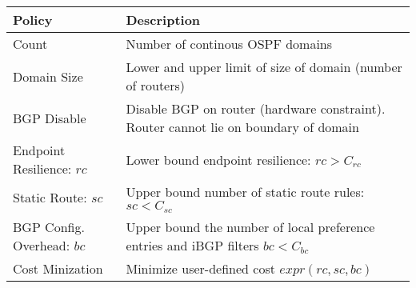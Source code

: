 \begin{table}[t!]
\begin{small}
	\begin{center}
		\begin{tabular}{m{7em} | m{17em} } 
			Policy & Description \\ 
			\hline
			Count & Number of continous OSPF domains  \\ \hline
			Domain Size  & Lower and upper
			limit of size of domain (number of routers) \\ \hline
			BGP \newline Disable & Disable BGP on router (hardware constraint). 
			Router cannot lie on boundary of domain \\ \hline
			Endpoint \newline Resilience: $rc$ & Lower bound endpoint resilience: \newline
			$rc > C_{rc}$\\ \hline
			Static Route: ${sc}$ & Upper bound number of static route rules: $sc < C_{sc}$ \\ \hline
			BGP Config. Overhead: $bc$ & Upper bound the number of local preference entries and iBGP filters $bc < C_{bc}$ \\ \hline
			Cost Minization & Minimize user-defined cost $expr(rc, sc, bc)$
		\end{tabular}
	\end{center}
	 \label{tab:configpolicysupport} 
\end{small}
\end{table}
